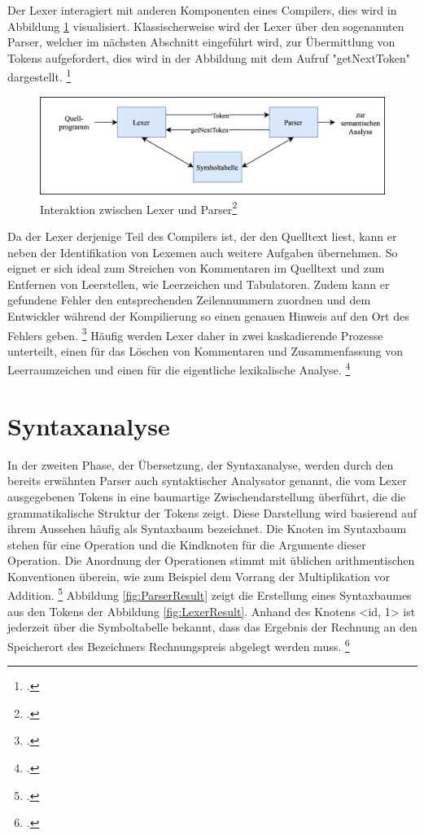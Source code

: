 Der Lexer interagiert mit anderen Komponenten eines Compilers,  dies wird in Abbildung \ref{fig:LexerInteraktionen} visualisiert.  Klassischerweise wird der Lexer über den sogenannten Parser, welcher im nächsten Abschnitt eingeführt wird,  zur Übermittlung von Tokens aufgefordert,  dies wird in der Abbildung mit dem Aufruf "getNextToken" dargestellt.  \footcite[Vgl.][S. 135]{Ullmann2008} 

\begin{figure}[!ht]
 \includegraphics[width=\textwidth,keepaspectratio]{Images/Compiler/LexerParser.png}
 \caption[Interaktion zwischen Lexer und Parser]{Interaktion zwischen Lexer und Parser\protect\footcite{Ullmann2008}}
 \label{fig:LexerInteraktionen}
\end{figure}

Da der Lexer derjenige Teil des Compilers ist, der den Quelltext liest, kann er neben der Identifikation von Lexemen auch weitere Aufgaben übernehmen. So eignet er sich ideal zum Streichen von Kommentaren im Quelltext und zum Entfernen von Leerstellen,  wie Leerzeichen und Tabulatoren.  Zudem kann er gefundene Fehler den entsprechenden Zeilennummern zuordnen und dem Entwickler während der Kompilierung so einen genauen Hinweis auf den Ort des Fehlers geben.  \footcite[Vgl.][S. 135.]{Ullmann2008} 
Häufig werden Lexer daher in zwei kaskadierende Prozesse unterteilt, einen für das Löschen von Kommentaren und Zusammenfassung von Leerraumzeichen und einen für die eigentliche lexikalische Analyse.  \footcite[Vgl.][S. 136.]{Ullmann2008} 

\section{Syntaxanalyse}
In der zweiten Phase, der Übersetzung, der Syntaxanalyse,  werden durch den bereits erwähnten Parser auch syntaktischer Analysator genannt,  die vom Lexer ausgegebenen Tokens in eine baumartige Zwischendarstellung überführt, die die grammatikalische Struktur der Tokens zeigt.  Diese Darstellung wird basierend auf ihrem Aussehen häufig als Syntaxbaum bezeichnet.  Die Knoten im Syntaxbaum stehen für eine Operation und die Kindknoten für die Argumente dieser Operation.  Die Anordnung der Operationen stimmt mit üblichen arithmentischen Konventionen überein,  wie zum Beispiel dem Vorrang der Multiplikation vor Addition. \footcite[Vgl.][S. 9]{Ullmann2008} Abbildung \ref{fig:ParserResult} zeigt die Erstellung eines Syntaxbaumes aus den Tokens  der Abbildung \ref{fig:LexerResult}.  Anhand des Knotens <id, 1> ist jederzeit über die Symboltabelle bekannt,  dass das Ergebnis der Rechnung an den Speicherort des Bezeichners Rechnungspreis abgelegt werden muss. \footcite[Vgl.][S. 9.]{Ullmann2008} 


